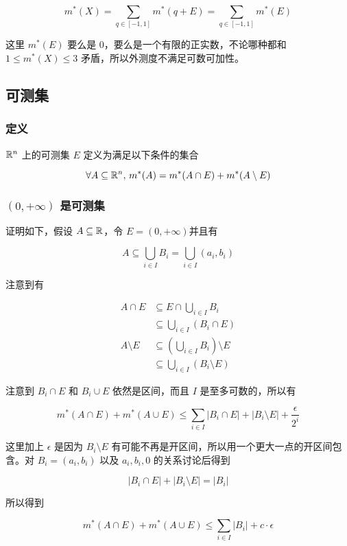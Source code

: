 \[
m^*(X) = \sum_{q \in [-1,1]}m^*(q+E) =  \sum_{q \in [-1,1]}m^*(E)
\]

这里 $m^*(E)$ 要么是 $0$，要么是一个有限的正实数，不论哪种都和 $1 \le m^*(X) \le 3$ 矛盾，所以外测度不满足可数可加性。


\subsection{可测集}

\subsubsection{定义}

$\mathbb{R}^n $ 上的可测集 $E$ 定义为满足以下条件的集合

\[
\forall A \subseteq \mathbb{R}^n,\, m^*(A) = m^*(A \cap E) + m^*(A \setminus E)
\]

\subsubsection{$(0, +\infty)$ 是可测集} 

证明如下，假设 $A \subseteq \mathbb{R}$，令 $ E = (0, +\infty)$并且有

\[
A \subseteq \bigcup_{i \in I} B_i = \bigcup_{i \in I} (a_i, b_i)
\]

注意到有

\begin{align*}
A \cap E &\subseteq E \cap \bigcup_{i \in I} B_i \\
 & \subseteq \bigcup_{i \in I} (B_i \cap E) \\
A \setminus E &\subseteq  (\bigcup_{i \in I} B_i) \setminus E \\
 & \subseteq \bigcup_{i \in I} (B_i \setminus E)
\end{align*}

注意到 $B_i \cap E$ 和 $B_i \cup E$ 依然是区间，而且 $I$ 是至多可数的，所以有

\[
m^*(A\cap E) + m^*(A \cup E) \le \sum_{i \in I} \lvert B_i \cap E\rvert + \lvert B_i \setminus E \rvert + \frac{\epsilon}{2^i}
\]

这里加上 $\epsilon$ 是因为 $B_i \setminus E$ 有可能不再是开区间，所以用一个更大一点的开区间包含。对 $B_i = (a_i, b_i)$ 以及 $a_i, b_i, 0$ 的关系讨论后得到

\[
\lvert B_i \cap E\rvert + \lvert B_i \setminus E \rvert = \lvert B_i \rvert
\]

所以得到

\[
m^*(A\cap E) + m^*(A \cup E) \le \sum_{i \in I} \lvert B_i \rvert + c \cdot \epsilon
\]

